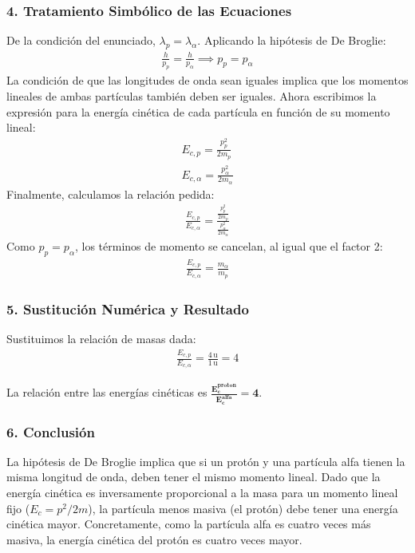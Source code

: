 \subsubsection*{4. Tratamiento Simbólico de las Ecuaciones}
De la condición del enunciado, $\lambda_p = \lambda_\alpha$. Aplicando la hipótesis de De Broglie:
\begin{gather}
    \frac{h}{p_p} = \frac{h}{p_\alpha} \implies p_p = p_\alpha
\end{gather}
La condición de que las longitudes de onda sean iguales implica que los momentos lineales de ambas partículas también deben ser iguales.
Ahora escribimos la expresión para la energía cinética de cada partícula en función de su momento lineal:
\begin{gather}
    E_{c,p} = \frac{p_p^2}{2m_p} \\
    E_{c,\alpha} = \frac{p_\alpha^2}{2m_\alpha}
\end{gather}
Finalmente, calculamos la relación pedida:
\begin{gather}
    \frac{E_{c,p}}{E_{c,\alpha}} = \frac{\frac{p_p^2}{2m_p}}{\frac{p_\alpha^2}{2m_\alpha}}
\end{gather}
Como $p_p = p_\alpha$, los términos de momento se cancelan, al igual que el factor 2:
\begin{gather}
    \frac{E_{c,p}}{E_{c,\alpha}} = \frac{m_\alpha}{m_p}
\end{gather}

\subsubsection*{5. Sustitución Numérica y Resultado}
Sustituimos la relación de masas dada:
\begin{gather}
    \frac{E_{c,p}}{E_{c,\alpha}} = \frac{4\,\text{u}}{1\,\text{u}} = 4
\end{gather}
\begin{cajaresultado}
La relación entre las energías cinéticas es $\boldsymbol{\frac{E_c^{proton}}{E_c^{alfa}} = 4}$.
\end{cajaresultado}

\subsubsection*{6. Conclusión}
\begin{cajaconclusion}
La hipótesis de De Broglie implica que si un protón y una partícula alfa tienen la misma longitud de onda, deben tener el mismo momento lineal. Dado que la energía cinética es inversamente proporcional a la masa para un momento lineal fijo ($E_c=p^2/2m$), la partícula menos masiva (el protón) debe tener una energía cinética mayor. Concretamente, como la partícula alfa es cuatro veces más masiva, la energía cinética del protón es cuatro veces mayor.
\end{cajaconclusion}

\newpage